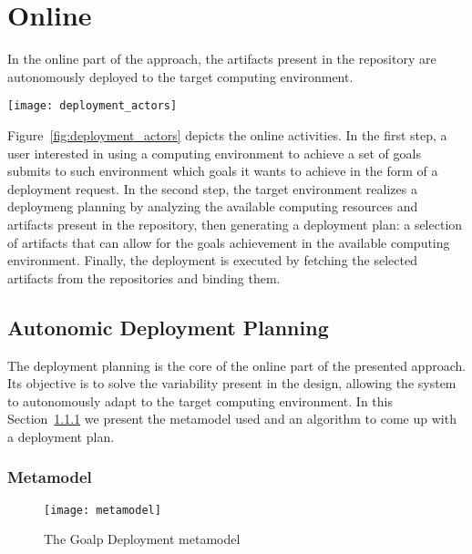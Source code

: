 \section{Online}
\label{sec:online}

In the online part of the approach, the artifacts present in the repository are autonomously deployed to the target computing environment.

\begin{figure*}[!htb]
  \centering
  \texttt{[image: deployment\_actors]}
  \caption{Goald Autonomic Deployment}
\label{fig:deployment_actors}
\end{figure*}

Figure~\ref{fig:deployment_actors} depicts the online activities. In the first step, a user interested in using a computing environment to achieve a set of goals submits to such environment which goals it wants to achieve in the form of a deployment request.
In the second step, the target environment realizes a deploymeng planning by analyzing the available computing resources and artifacts present in the repository, then
generating a deployment plan:  a selection of artifacts that can allow for the goals achievement in the available computing environment. Finally, the deployment is executed by fetching the selected artifacts from the repositories and binding them.

\subsection{Autonomic Deployment Planning}
\label{sec:planning}

The deployment planning is the core of the online part of the presented approach. Its objective is to solve the variability present in the design, allowing the system to autonomously adapt to the target computing environment. In this Section~\ref{sec:metamodel} we present the metamodel used and an algorithm to come up with a deployment plan.

\subsubsection{Metamodel}
\label{sec:metamodel}

\begin{figure}[!htb]
  \centering
  \texttt{[image: metamodel]}
  \caption{The Goalp Deployment metamodel}
  \label{fig:metamodel}
\end{figure}

